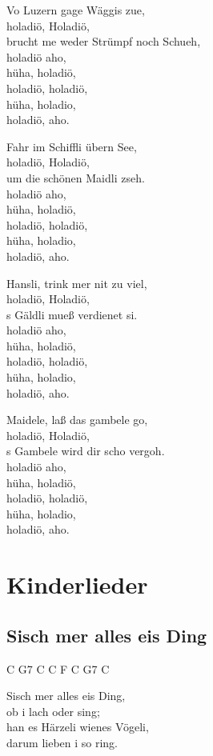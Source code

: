 \documentclass[
  letterpaper,
  twoside=false]{scrbook}
\begin{document}
Vo Luzern gage Wäggis zue,\\
holadiö, Holadiö,\\
brucht me weder Strümpf noch Schueh,\\
holadiö aho,\\
hüha, holadiö,\\
holadiö, holadiö,\\
hüha, holadio,\\
holadiö, aho.

Fahr im Schiffli übern See,\\
holadiö, Holadiö,\\
um die schönen Maidli zseh.\\
holadiö aho,\\
hüha, holadiö,\\
holadiö, holadiö,\\
hüha, holadio,\\
holadiö, aho.

Hansli, trink mer nit zu viel,\\
holadiö, Holadiö,\\
\textquotesingle s Gäldli mueß verdienet si.\\
holadiö aho,\\
hüha, holadiö,\\
holadiö, holadiö,\\
hüha, holadio,\\
holadiö, aho.

Maidele, laß das gambele go,\\
holadiö, Holadiö,\\
\textquotesingle s Gambele wird dir scho vergoh.\\
holadiö aho,\\
hüha, holadiö,\\
holadiö, holadiö,\\
hüha, holadio,\\
holadiö, aho.

\part{Kinderlieder}

\hypertarget{sisch-mer-alles-eis-ding}{%
\chapter{S\textquotesingle isch mer alles eis
Ding}\label{sisch-mer-alles-eis-ding}}

C G7 C C F C G7 C

S\textquotesingle isch mer alles eis Ding,\\
ob i lach oder sing;\\
han es Härzeli wienes Vögeli,\\
darum lieben i so ring.
\end{document}

